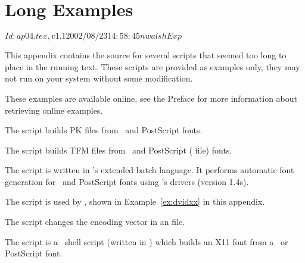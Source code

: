 \chapter{Long Examples}
\RCSID$Id: ap04.tex,v 1.1 2002/08/23 14:58:45 nwalsh Exp $
\label{app:examples}

This appendix contains the source for several scripts that seemed
too long to place in the running text.  These scripts are provided
as examples only, they may not run on your system without some 
modification.

These examples are available online,
see the Preface for more information about retrieving online examples.

\bgroup
\makeatletter
\def\example@font{\tt\fontsize{8.42}{9.5pt}\selectfont}
\makeatother

The  script builds PK files from \MF\ and PostScript
fonts.

\newpage

The  script builds TFM files from \MF\ and
PostScript ( file) fonts.  

\newpage

The  script is written in 's extended
batch language.  It performs automatic font generation for \MF\
and PostScript fonts using \emTeX's drivers (version 1.4s).

\newpage

The  script is used by , shown
in Example~\ref{ex:dvidxx} in this appendix.

\newpage

The  script changes the encoding vector in an
\ext{AFM} file.

\newpage

The  script is a \Unix\ shell script (written in
\program{bash}) which builds an X11 font from a \MF\ or PostScript
font. 

